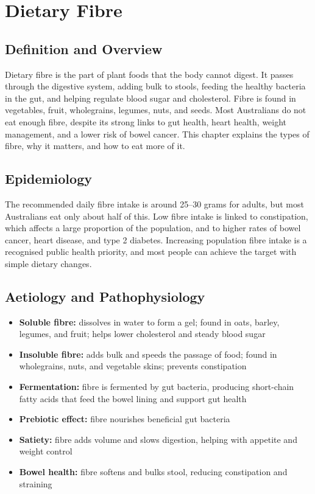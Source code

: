 \chapter{Dietary Fibre}

\section*{Definition and Overview}
Dietary fibre is the part of plant foods that the body cannot digest. It passes through the digestive system, adding bulk to stools, feeding the healthy bacteria in the gut, and helping regulate blood sugar and cholesterol. Fibre is found in vegetables, fruit, wholegrains, legumes, nuts, and seeds. Most Australians do not eat enough fibre, despite its strong links to gut health, heart health, weight management, and a lower risk of bowel cancer. This chapter explains the types of fibre, why it matters, and how to eat more of it.

\section*{Epidemiology}
The recommended daily fibre intake is around 25--30 grams for adults, but most Australians eat only about half of this. Low fibre intake is linked to constipation, which affects a large proportion of the population, and to higher rates of bowel cancer, heart disease, and type 2 diabetes. Increasing population fibre intake is a recognised public health priority, and most people can achieve the target with simple dietary changes.

\section*{Aetiology and Pathophysiology}
\begin{itemize}
    \item \textbf{Soluble fibre:} dissolves in water to form a gel; found in oats, barley, legumes, and fruit; helps lower cholesterol and steady blood sugar
    \item \textbf{Insoluble fibre:} adds bulk and speeds the passage of food; found in wholegrains, nuts, and vegetable skins; prevents constipation
    \item \textbf{Fermentation:} fibre is fermented by gut bacteria, producing short-chain fatty acids that feed the bowel lining and support gut health
    \item \textbf{Prebiotic effect:} fibre nourishes beneficial gut bacteria
    \item \textbf{Satiety:} fibre adds volume and slows digestion, helping with appetite and weight control
    \item \textbf{Bowel health:} fibre softens and bulks stool, reducing constipation and straining
\end{itemize}


